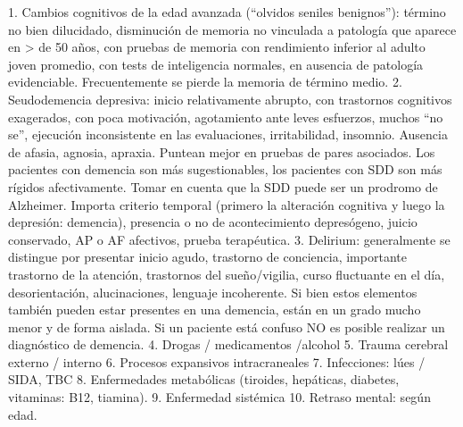 \documentclass[encares.tex]{subfiles}
\begin{document}
1. Cambios cognitivos de la edad avanzada (“olvidos seniles benignos”): término no bien dilucidado, disminución de memoria no vinculada a patología que aparece en > de 50 años, con pruebas de memoria con rendimiento inferior al adulto joven promedio, con tests de inteligencia normales, en ausencia de patología evidenciable. Frecuentemente se pierde la memoria de término medio.
2. Seudodemencia depresiva: inicio relativamente abrupto, con trastornos cognitivos exagerados, con poca motivación, agotamiento ante leves esfuerzos, muchos “no se”, ejecución inconsistente en las evaluaciones, irritabilidad, insomnio. Ausencia de afasia, agnosia, apraxia. Puntean mejor en pruebas de pares asociados. Los pacientes con demencia son más sugestionables, los pacientes con SDD son más rígidos afectivamente. Tomar en cuenta que la SDD puede ser un prodromo de Alzheimer. Importa criterio temporal (primero la alteración cognitiva y luego la depresión: demencia), presencia o no de acontecimiento depresógeno, juicio conservado, AP o AF afectivos, prueba terapéutica.
3. Delirium: generalmente se distingue por presentar inicio agudo, trastorno de conciencia, importante trastorno de la atención, trastornos del sueño/vigilia, curso fluctuante en el día, desorientación, alucinaciones, lenguaje incoherente. Si bien estos elementos también pueden estar presentes en una demencia, están en un grado mucho menor y de forma aislada. Si un paciente está confuso NO es posible realizar un diagnóstico de demencia.
4. Drogas / medicamentos /alcohol
5. Trauma cerebral externo / interno
6. Procesos expansivos intracraneales
7. Infecciones: lúes / SIDA, TBC
8. Enfermedades metabólicas (tiroides, hepáticas, diabetes, vitaminas: B12, tiamina).
9. Enfermedad sistémica
10. Retraso mental: según edad.
\end{document}
